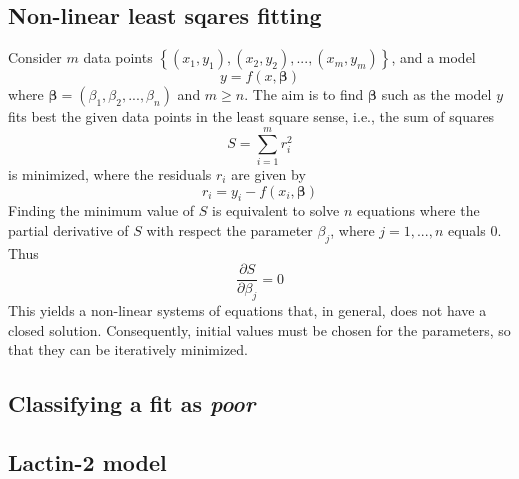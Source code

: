 \documentclass[titlepage,11pt]{article}
\begin{document}
\begin{linenumbers}
	\subsection{Non-linear least sqares fitting}\label{subsec:non-linear least squares fitting}
	Consider $ m $ data points $ \left\{(x_1, y_1), (x_2, y_2), ... , (x_m, y_m)\right\} $, and a model
	\begin{equation}
	y = f(x, \boldsymbol{\beta})
	\end{equation}
	where $ \boldsymbol{\beta} = (\beta_1, \beta_2, ... , \beta_n) $ and $ m \geq n $. The aim is to find $ \boldsymbol{\beta}$ such as the model $ y $ fits best the given data points in the least square sense, i.e., the sum of squares
	\begin{equation}
	S = \sum_{i = 1}^{m} r^2_i
	\end{equation}
	is minimized, where the residuals $ r_i $ are given by
	\begin{equation}
	r_i = y_i - f(x_i, \boldsymbol{\beta})
	\end{equation}
	Finding the minimum value of $ S $ is equivalent to solve $ n $ equations where the partial derivative of $ S $ with respect the parameter $ \beta_j $, where $ j = 1, ..., n $ equals 0. Thus
	\begin{equation}
	\frac{\partial S}{\partial \beta_j} = 0	
	\end{equation}
	This yields a non-linear systems of equations that, in general, does not have a closed solution. Consequently, initial values must be chosen for the parameters, so that they can be iteratively minimized. 
	\subsection{Classifying a fit as \textit{poor}}\label{subsec:poor}
	\subsection{Lactin-2 model}\label{subsec:Lactin-2}
	
	
\end{linenumbers}
\newpage


\end{document}
